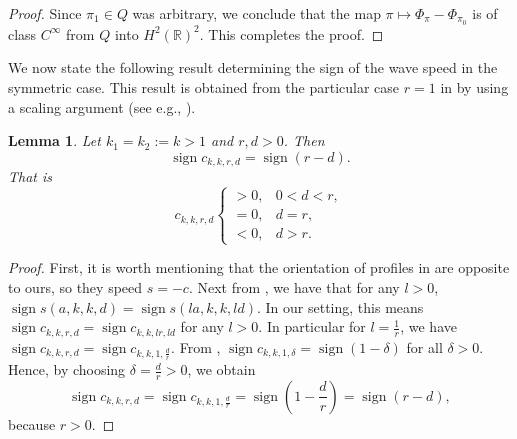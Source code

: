 \documentclass[11pt]{article}
\DeclareMathOperator{\sign}{sign}
\numberwithin{equation}{section}
\newcommand{\1}{\mathbbm{1}}
\numberwithin{equation}{section}
\newtheorem{lemma}[theorem]{Lemma}
\theoremstyle{definition}
\def \R {\mathbb{R}}
\def \V {\mathcal{V}}
\numberwithin{equation}{section}
\begin{document}
\begin{proof}
	Since $\pi_1\in Q$ was arbitrary, we conclude that the  map $\pi\mapsto \Phi_{\pi}-\Phi_{\pi_0}$ is of class $C^\infty$ from $Q$ into $H^2(\R)^2$. 
	This completes the proof.
\end{proof}

We now state the following result determining the sign of the wave speed in the symmetric case. This result is obtained from the particular case $r=1$ in \cite[Theorem 1.1]{kenne2026} by using a scaling argument (see e.g., \cite{guo2013}).

 \begin{lemma}\label{lemmasign}
	Let $k_1=k_2:=k>1$ and $r,d>0$. Then
	\begin{equation}\label{eq3}
		\sign c_{k,k,r,d}=\sign(r-d).
	\end{equation}
That is
	\begin{equation}\label{eq4}
		c_{k,k,r,d}\left\{ 
		\begin{array}{llllll}
			>0, &  0<d<r,\\
			=0, &  d=r,\\
			<0, & d>r.
		\end{array} 
		\right.
	\end{equation}
\end{lemma}

\begin{proof}
First, it is worth mentioning that the orientation of profiles in \cite{guo2013} are opposite to ours, so they speed $s=-c$. Next from \cite[Theorem 1.3]{guo2013}, we have that for any $l>0$, $\sign s(a,k,k,d)=\sign s(la,k,k,ld)$. In our setting, this means $\sign c_{k,k,r,d}=\sign c_{k,k,lr,ld}$ for any $l>0$. In particular for $l=\frac{1}{r}$, we have $\sign c_{k,k,r,d}=\sign c_{k,k,1,\frac{d}{r}}$.  From \cite[Theorem 1.1]{kenne2026},  $\sign c_{k,k,1,\delta}=\sign (1-\delta)$ for all $\delta>0$. Hence, by choosing $\delta=\frac{d}{r}>0$, we obtain
\begin{equation*}
\sign c_{k,k,r,d} =\sign c_{k,k,1,\frac{d}{r}}=\sign \left(1-\frac{d}{r}\right)=\sign(r-d),
\end{equation*}
because $r>0$. 
\end{proof}
\end{document}
